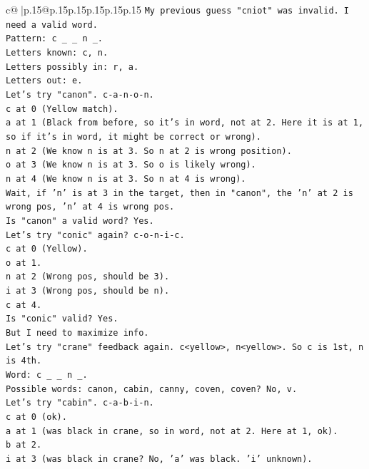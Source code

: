 \documentclass{article}
\begin{document}
{\begin{supertabular}{c@{$\;$}|p{.15\linewidth}@{}p{.15\linewidth}p{.15\linewidth}p{.15\linewidth}p{.15\linewidth}p{.15\linewidth}}
{{{\texttt{My previous guess "cniot" was invalid. I need a valid word.} \\
\texttt{Pattern: c \_ \_ n \_.} \\
\texttt{Letters known: c, n.} \\
\texttt{Letters possibly in: r, a.} \\
\texttt{Letters out: e.} \\
\texttt{Let's try "canon". c{-}a{-}n{-}o{-}n.} \\
\texttt{c at 0 (Yellow match).} \\
\texttt{a at 1 (Black from before, so it's in word, not at 2. Here it is at 1, so if it's in word, it might be correct or wrong).} \\
\texttt{n at 2 (We know n is at 3. So n at 2 is wrong position).} \\
\texttt{o at 3 (We know n is at 3. So o is likely wrong).} \\
\texttt{n at 4 (We know n is at 3. So n at 4 is wrong).} \\
\texttt{Wait, if 'n' is at 3 in the target, then in "canon", the 'n' at 2 is wrong pos, 'n' at 4 is wrong pos.} \\
\texttt{Is "canon" a valid word? Yes.} \\
\texttt{Let's try "conic" again? c{-}o{-}n{-}i{-}c.} \\
\texttt{c at 0 (Yellow).} \\
\texttt{o at 1.} \\
\texttt{n at 2 (Wrong pos, should be 3).} \\
\texttt{i at 3 (Wrong pos, should be n).} \\
\texttt{c at 4.} \\
\texttt{Is "conic" valid? Yes.} \\
\texttt{But I need to maximize info.} \\
\texttt{Let's try "crane" feedback again. c<yellow>, n<yellow>. So c is 1st, n is 4th.} \\
\texttt{Word: c \_ \_ n \_.} \\
\texttt{Possible words: canon, cabin, canny, coven, coven? No, v.} \\
\texttt{Let's try "cabin". c{-}a{-}b{-}i{-}n.} \\
\texttt{c at 0 (ok).} \\
\texttt{a at 1 (was black in crane, so in word, not at 2. Here at 1, ok).} \\
\texttt{b at 2.} \\
\texttt{i at 3 (was black in crane? No, 'a' was black. 'i' unknown).} \\
}}}
\end{supertabular}}
\end{document}
